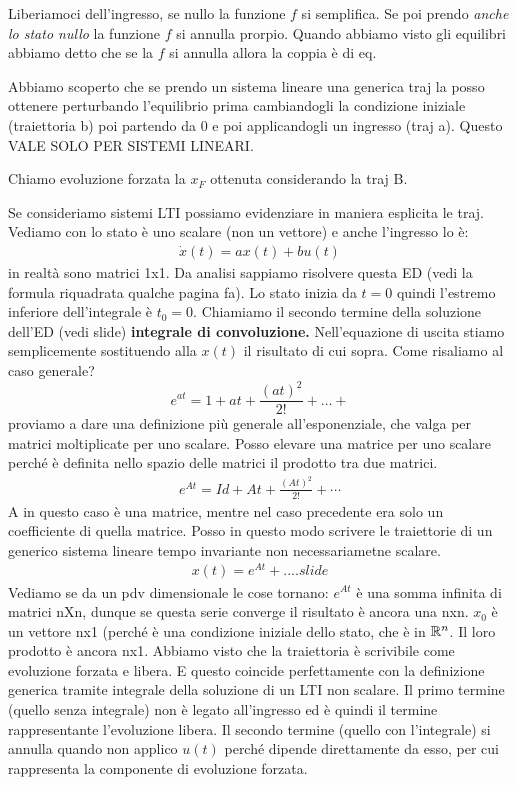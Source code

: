 \documentclass[a4paper]{report}
\begin{document}
\starbreak
Liberiamoci dell'ingresso, se nullo la funzione $f$ si semplifica. Se poi prendo \textit{anche lo stato nullo} la funzione $f$ si annulla prorpio. Quando abbiamo visto gli equilibri abbiamo detto che se la $f$ si annulla allora la coppia è  di eq.

\bb
Abbiamo scoperto che se prendo un sistema lineare una generica traj la posso ottenere perturbando l'equilibrio prima cambiandogli la condizione iniziale (traiettoria b) poi partendo da 0 e poi applicandogli un ingresso (traj a). Questo VALE SOLO PER SISTEMI LINEARI.

\bb
Chiamo evoluzione forzata la $x_F$ ottenuta considerando la traj  B.



\newpage
Se consideriamo sistemi LTI possiamo evidenziare in maniera esplicita le traj. Vediamo con lo stato è uno scalare (non un vettore) e anche l'ingresso lo è:
\begin{align*}
	\dot x(t) =  ax(t)  + bu(t)
\end{align*}
in realtà sono matrici 1x1.  Da analisi sappiamo risolvere questa ED (vedi la formula riquadrata qualche pagina fa). Lo stato inizia da $t= 0$ quindi l'estremo inferiore dell'integrale è $t_0  = 0.$ Chiamiamo il secondo termine della soluzione dell'ED (vedi slide) \textbf{integrale di convoluzione.} Nell'equazione di uscita stiamo semplicemente sostituendo alla $x(t)$ il risultato di cui sopra.
\bb
Come risaliamo al caso generale? 
\begin{equation*}
	e^{at} = 1+at + \frac{(at)^2}{2!} + \ldots + 
\end{equation*}
proviamo a dare una definizione più generale all'esponenziale, che valga per matrici moltiplicate per uno scalare. Posso elevare una matrice per uno scalare perché è definita nello spazio delle matrici il prodotto tra due matrici.
\begin{align*}
	e^{At} = Id+ At+\frac{(At)^2}{2!} + \cdots 
\end{align*}
A in questo caso è una matrice, mentre nel caso precedente era solo un coefficiente di quella matrice. Posso in questo modo scrivere le traiettorie di un generico sistema lineare tempo invariante non necessariametne scalare. 
\begin{align*}
	x(t)= e^{At} + .... slide
\end{align*}
Vediamo se da un pdv dimensionale le cose tornano: $e^{At}$ è una somma infinita di matrici nXn, dunque se questa serie converge il risultato è ancora una nxn. $x_0$ è un vettore nx1 (perché è una condizione iniziale dello stato, che è in $\mathbb{R}^n$. Il loro prodotto è ancora nx1. 
\bb
Abbiamo visto che la traiettoria è scrivibile come evoluzione forzata e libera. E questo coincide perfettamente con la definizione generica tramite integrale della soluzione di un LTI non scalare. Il primo termine (quello senza integrale) non è legato all'ingresso ed è quindi il termine rappresentante l'evoluzione libera. Il secondo termine (quello con l'integrale) si annulla quando non applico $u(t)$ perché dipende direttamente da esso, per cui rappresenta la componente di evoluzione forzata.
\end{document}

